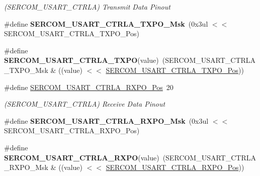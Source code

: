 \begin{DoxyCompactItemize}
\begin{DoxyCompactList}\small\item\em (S\+E\+R\+C\+O\+M\+\_\+\+U\+S\+A\+R\+T\+\_\+\+C\+T\+R\+L\+A) Transmit Data Pinout \end{DoxyCompactList}\item 
\hypertarget{group___s_a_m_l21___s_e_r_c_o_m_ga4a4325e19808e8f06dc39936628f54cc}{}\#define {\bfseries S\+E\+R\+C\+O\+M\+\_\+\+U\+S\+A\+R\+T\+\_\+\+C\+T\+R\+L\+A\+\_\+\+T\+X\+P\+O\+\_\+\+Msk}~(0x3ul $<$$<$ S\+E\+R\+C\+O\+M\+\_\+\+U\+S\+A\+R\+T\+\_\+\+C\+T\+R\+L\+A\+\_\+\+T\+X\+P\+O\+\_\+\+Pos)\label{group___s_a_m_l21___s_e_r_c_o_m_ga4a4325e19808e8f06dc39936628f54cc}

\item 
\hypertarget{group___s_a_m_l21___s_e_r_c_o_m_ga3c5410d637dbff76ce9e381fed241b69}{}\#define {\bfseries S\+E\+R\+C\+O\+M\+\_\+\+U\+S\+A\+R\+T\+\_\+\+C\+T\+R\+L\+A\+\_\+\+T\+X\+P\+O}(value)~(S\+E\+R\+C\+O\+M\+\_\+\+U\+S\+A\+R\+T\+\_\+\+C\+T\+R\+L\+A\+\_\+\+T\+X\+P\+O\+\_\+\+Msk \& ((value) $<$$<$ \hyperlink{group___s_a_m_l21___s_e_r_c_o_m_gab23dcbcc6dedf8763535234e70e95360}{S\+E\+R\+C\+O\+M\+\_\+\+U\+S\+A\+R\+T\+\_\+\+C\+T\+R\+L\+A\+\_\+\+T\+X\+P\+O\+\_\+\+Pos}))\label{group___s_a_m_l21___s_e_r_c_o_m_ga3c5410d637dbff76ce9e381fed241b69}

\item 
\hypertarget{group___s_a_m_l21___s_e_r_c_o_m_gabd9b6a90ba85b567c1b4abc403ce360d}{}\#define \hyperlink{group___s_a_m_l21___s_e_r_c_o_m_gabd9b6a90ba85b567c1b4abc403ce360d}{S\+E\+R\+C\+O\+M\+\_\+\+U\+S\+A\+R\+T\+\_\+\+C\+T\+R\+L\+A\+\_\+\+R\+X\+P\+O\+\_\+\+Pos}~20\label{group___s_a_m_l21___s_e_r_c_o_m_gabd9b6a90ba85b567c1b4abc403ce360d}

\begin{DoxyCompactList}\small\item\em (S\+E\+R\+C\+O\+M\+\_\+\+U\+S\+A\+R\+T\+\_\+\+C\+T\+R\+L\+A) Receive Data Pinout \end{DoxyCompactList}\item 
\hypertarget{group___s_a_m_l21___s_e_r_c_o_m_ga1f4a123b6bb332a9b92ab698d50720e0}{}\#define {\bfseries S\+E\+R\+C\+O\+M\+\_\+\+U\+S\+A\+R\+T\+\_\+\+C\+T\+R\+L\+A\+\_\+\+R\+X\+P\+O\+\_\+\+Msk}~(0x3ul $<$$<$ S\+E\+R\+C\+O\+M\+\_\+\+U\+S\+A\+R\+T\+\_\+\+C\+T\+R\+L\+A\+\_\+\+R\+X\+P\+O\+\_\+\+Pos)\label{group___s_a_m_l21___s_e_r_c_o_m_ga1f4a123b6bb332a9b92ab698d50720e0}

\item 
\hypertarget{group___s_a_m_l21___s_e_r_c_o_m_gafdd4e7d8a22f28f4d60010efc8db5e6f}{}\#define {\bfseries S\+E\+R\+C\+O\+M\+\_\+\+U\+S\+A\+R\+T\+\_\+\+C\+T\+R\+L\+A\+\_\+\+R\+X\+P\+O}(value)~(S\+E\+R\+C\+O\+M\+\_\+\+U\+S\+A\+R\+T\+\_\+\+C\+T\+R\+L\+A\+\_\+\+R\+X\+P\+O\+\_\+\+Msk \& ((value) $<$$<$ \hyperlink{group___s_a_m_l21___s_e_r_c_o_m_gabd9b6a90ba85b567c1b4abc403ce360d}{S\+E\+R\+C\+O\+M\+\_\+\+U\+S\+A\+R\+T\+\_\+\+C\+T\+R\+L\+A\+\_\+\+R\+X\+P\+O\+\_\+\+Pos}))\label{group___s_a_m_l21___s_e_r_c_o_m_gafdd4e7d8a22f28f4d60010efc8db5e6f}


\end{DoxyCompactItemize}
